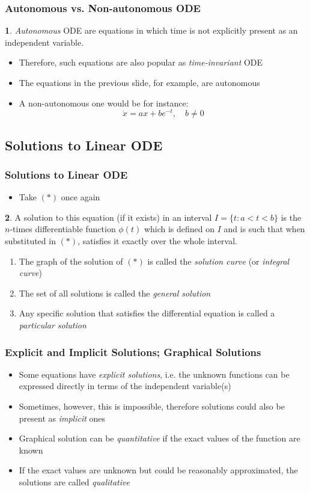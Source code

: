 \documentclass[10pt,usenames,dvipsnames]{beamer}
\theoremstyle{definition}
\newtheorem{definition}{\translate{Definition}}
\begin{document}
\begin{frame}[fragile]
\frametitle{Autonomous vs. Non-autonomous ODE}
\begin{definition}
	\textit{Autonomous} ODE are equations in which time is not explicitly present as an independent variable.	
\end{definition}
\begin{itemize}
	\item Therefore, such equations are also popular as \textit{time-invariant} ODE
	\item The equations in the previous slide, for example, are autonomous
	\item A non-autonomous one would be for instance:
	\[
		\dot{x} = ax + be^{-t}, \quad b \neq 0
	\]
\end{itemize}
\end{frame}

\subsection{Solutions to Linear ODE}
\begin{frame}[fragile]
\frametitle{Solutions to Linear ODE}
\begin{itemize}
	\item Take $(*)$ once again
\end{itemize}
\begin{definition}
	A solution to this equation (if it exists) in an interval $I = \{t: a < t < b\}$ is the $n$-times differentiable function $\phi(t)$ which is defined on $I$ and is such that when substituted in $(*)$, satisfies it exactly over the whole interval.
\end{definition}
\begin{enumerate}
	\item The graph of the solution of $(*)$ is called the \textit{solution curve} (or \textit{integral curve})
	\item The set of all solutions is called the \textit{general solution}
	\item Any specific solution that satisfies the differential equation is called a \textit{particular solution}
\end{enumerate}
\end{frame}

\begin{frame}[fragile]
\frametitle{Explicit and Implicit Solutions; Graphical Solutions}
\begin{itemize}
	\item Some equations have \textit{explicit solutions}, i.e. the unknown functions can be expressed directly in terms of the independent variable(s)
	\item Sometimes, however, this is impossible, therefore solutions could also be present as \textit{implicit} ones
	\item Graphical solution can be \textit{quantitative} if the exact values of the function are known
	\item If the exact values are unknown but could be reasonably approximated, the solutions are called \textit{qualitative}
\end{itemize}
\end{frame}
\end{document}
